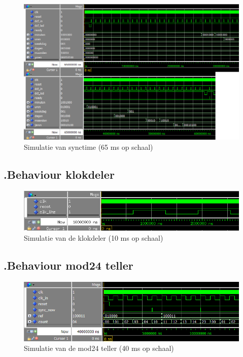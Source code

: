 \begin{figure}[ht!]
\includegraphics[width=\textwidth,height=\textheight,keepaspectratio]{Figuren/DCF77/Synctime.png}
\caption{Simulatie van synctime (65 ms op schaal)}
\end{figure}
\subsection*{\label{fig: klokdeler_beh}\thesubsection.\quad Behaviour klokdeler}
\begin{figure}[ht!]
\includegraphics[width=\textwidth,height=\textheight,keepaspectratio]{Figuren/DCF77/Klokdeler.png}
\caption{Simulatie van de  klokdeler (10 ms op schaal)}
\end{figure}
\subsection*{\label{fig: mod24_beh}\thesubsection.\quad Behaviour mod24 teller}
\begin{figure}[ht!]
\includegraphics[width=\textwidth,height=\textheight,keepaspectratio]{Figuren/DCF77/Mod24_teller.png}
\caption{Simulatie van de mod24 teller (40 ms op schaal)}
\end{figure}
